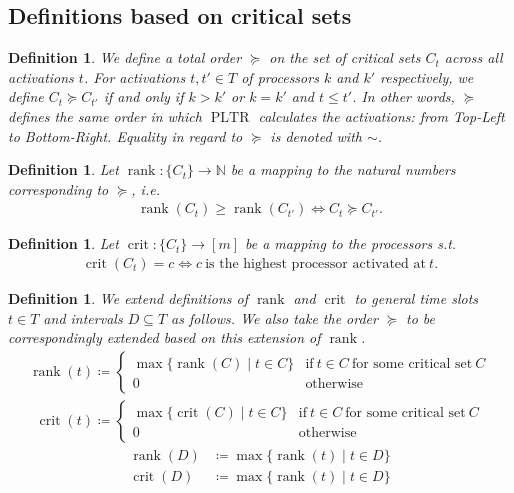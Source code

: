 \documentclass[a4paper]{article}
\DeclareMathOperator{\PLTR}{PLTR}
\DeclareMathOperator{\rank}{rank}
\DeclareMathOperator{\crit}{crit}
\newtheorem{definition}[theorem]{Definition}
\begin{document}
\subsection{Definitions based on critical sets}
\begin{definition}
  We define a total order $\succeq$ on the set of critical sets $C_t$ across all activations $t$.
  For activations $t, t' \in T$ of processors $k$ and $k'$ respectively, we define $C_t \succeq C_{t'}$ if and only if $k > k'$ or $k = k'$ and $t \leq t'$.
  In other words, $\succeq$ defines the same order in which $\PLTR$ calculates the activations: from Top-Left to Bottom-Right.
  Equality in regard to $\succeq$ is denoted with $\sim$.
\end{definition}
\begin{definition}
  Let $\rank: \{C_t\} \rightarrow \mathbb{N}$ be a mapping to the natural numbers corresponding to $\succeq$, i.e.
  \begin{align}
    \rank(C_t) \geq \rank(C_{t'})
    \iff
    C_t \succeq C_{t'} \text{.}
  \end{align}
\end{definition}
\begin{definition}
  Let $\crit: \{C_t\} \rightarrow [m]$ be a mapping to the processors s.t.
  \begin{align}
    \crit(C_t) = c
    \iff
    c~\text{is the highest processor activated at}~t \text{.}
  \end{align}
\end{definition}
\begin{definition}
  We extend definitions of $\rank$ and $\crit$ to general time slots $t \in T$ and intervals $D \subseteq T$ as follows.
  We also take the order $\succeq$ to be correspondingly extended based on this extension of $\rank$.
  \begin{align}
    \rank(t) \coloneqq
    \begin{cases}
      \max \{\rank(C) \mid t \in C \}
      & \text{if}~t \in C~\text{for some critical set}~C
      \\0
      & \text{otherwise}
    \end{cases}
  \end{align}
  \begin{align}
    \crit(t) \coloneqq
    \begin{cases}
      \max \{\crit(C) \mid t \in C \}
      & \text{if}~t \in C~\text{for some critical set}~C
      \\0
      & \text{otherwise}
    \end{cases}
  \end{align}
  \begin{align}
    \rank(D) &\coloneqq \max \{ \rank(t) \mid t \in D \}
    \\ \crit(D) &\coloneqq \max \{ \rank(t) \mid t \in D \}
  \end{align}
\end{definition}
\end{document}
